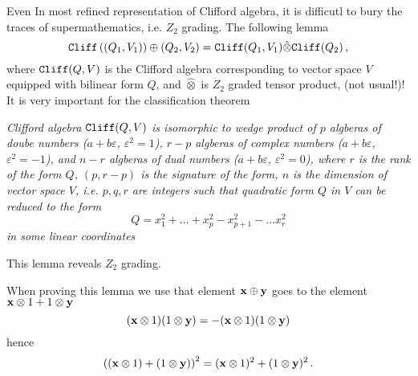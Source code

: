  

\baselineskip=14pt
\def\vare {\varepsilon}
\def\t {\tilde}
\def\a {\alpha}
\def\K {{\bf K}}
\def\N {{\bf N}}
\def\C {{\cal C}}
\def\L {{\cal L}}
\def\E {{\bf E}}
\def\s {{\sigma}}
\def\S {{\Sigma}}
\def\p{\partial}
\def\vare{{\varepsilon}}
\def\Q {{\bf Q}}
\def\D {{\cal D}}
\def\G {{\Gamma}}
\def\Z {{\bf Z}}
\def\R  {{\bf R}}
\def\l {\lambda}
\def\ll {{\bf l}}
\def\degree {{\bf {\rm degree}\,\,}}
\def \finish {${\,\,\vrule height1mm depth2mm width 8pt}$}
\def \m {\medskip}
\def\p {\partial}
\def\r {{\bf r}}
\def\pt {{\bf p}}
\def\v {{\bf v}}
\def\n {{\bf n}}
\def\t {{\bf t}}
\def\b {{\bf b}}
\def\c {{\bf c }}
\def\e{{\bf e}}
\def\f{{\bf f}}
\def\ac {{\bf a}}
\def \X   {{\bf X}}
\def \Y   {{\bf Y}}
\def \x   {{\bf x}}
\def \y   {{\bf y}}
\def\w {{\omega}}
\def \Tr  {{\rm Tr\,}}
\def\dim {{\rm dim\,\,}}
\def\t {{\tilde}} 
\def\dist {{\hbox{\tt "distance"}}}
\def  \dim {{\rm dim\,}}
\def  \Im  {{\rm Im\,}}
\def  \ker {{\rm ker\,}}


\def \Cl {\hbox{\tt Cliff}}

 Even In most refined representation of   
Clifford algebra, it is difficutl to bury the traces 
of supermathematics, i.e.
$Z_2$ grading. The following lemma
           $$
\Cl \left(
 \left(Q_1,V_1\right)
   \right)
\oplus 
\left(Q_2,V_2\right)
=
\Cl (Q_1,V_1){\hat \otimes}
\Cl (Q_2)\,,
         $$
where $\Cl (Q, V)$ is the Clifford algebra corresponding
to vector space $V$ equipped with bilinear form $Q$,
and $\hat\otimes$ is $Z_2$ graded tensor product,
(not usual!)!
It is very important for the classification theorem

{\it Clifford algebra $\Cl(Q,V)$ is isomorphic to
wedge product of 
$p$ algberas of doube numbers
($a+b\vare$, $\vare^2=1$), 
$r-p$ algberas of complex  numbers
($a+b\vare$, $\vare^2=-1$), and 
$n-r$ algberas of dual numbers
($a+b\vare$, $\vare^2=0$), 
where   
$r$ is the rank of the form $Q$, 
$(p,r-p)$
is the signature of the form, 
$n$ is the dimension of  vector space $V$, 
i.e.  $p,q,r$ are integers such that  quadratic form $Q$
in $V$ can be reduced to the form  
          $$
Q=x_1^2+\dots+x_p^2-x_{p+1}^2-\dots x_r^2
          $$
in some linear coordinates
}

This lemma reveals $Z_2$ grading.


When proving this lemma we use that
    element $\x\oplus \y$ 
  goes to the element $\x\otimes 1+1\otimes \y$
    $$
(\x\otimes 1)
(1\otimes \y)
=
 -(\x\otimes 1)
(1\otimes \y)
    $$
hence
     $$
\left(
(\x\otimes 1)+
(1\otimes \y)
\right)^2=
(\x\otimes 1)^2
+(1\otimes \y)^2\,.
      $$
\bye 

